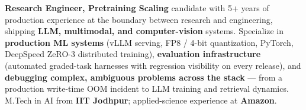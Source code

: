 \documentclass[letter,10pt]{article}
\begin{document}

\textbf{Research Engineer, Pretraining Scaling} candidate with 5+ years of production experience at the boundary between research and engineering, shipping \textbf{LLM, multimodal, and computer-vision} systems.
Specialize in \textbf{production ML systems} (vLLM serving, FP8 / 4-bit quantization, PyTorch, DeepSpeed ZeRO-3 distributed training), \textbf{evaluation infrastructure} (automated graded-task harnesses with regression visibility on every release), and \textbf{debugging complex, ambiguous problems across the stack} — from a production write-time OOM incident to LLM training and retrieval dynamics.
M.Tech in AI from \textbf{IIT Jodhpur}; applied-science experience at \textbf{Amazon}.
\end{document}
